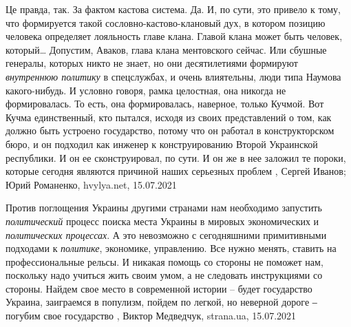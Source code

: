 Це правда, так. За фактом кастова система.
Да. И, по сути, это привело к тому, что формируется такой
сословно-кастово-клановый дух, в котором позицию человека определяет лояльность
главе клана. Главой клана может быть человек, который… Допустим, Аваков, глава
клана ментовского сейчас. Или сбушные генералы, которых никто не знает, но они
десятилетиями формируют \emph{внутреннюю политику} в спецслужбах, и очень влиятельны,
люди типа Наумова какого-нибудь. И условно говоря, рамка целостная, она никогда
не формировалась. То есть, она формировалась, наверное, только Кучмой.
Вот Кучма единственный, кто пытался, исходя из своих представлений о том, как
должно быть устроено государство, потому что он работал в конструкторском бюро,
и он подходил как инженер к конструированию Второй Украинской республики. И он
ее сконструировал, по сути. И он же в нее заложил те пороки, которые сегодня
являются причиной наших серьезных проблем
, 
Сергей Иванов; Юрий Романенко, hvylya.net, 15.07.2021

Против поглощения Украины другими странами нам необходимо запустить
\emph{политический} процесс поиска места Украины в мировых экономических и
\emph{политических процессах}. А это невозможно с сегодняшними примитивными подходами
к \emph{политике}, экономике, управлению. Все нужно менять, ставить на
профессиональные рельсы. И никакая помощь со стороны не поможет нам, поскольку
надо учиться жить своим умом, а не следовать инструкциями со стороны. Найдем
свое место в современной истории – будет государство Украина, заиграемся в
популизм, пойдем по легкой, но неверной дороге ‒ погубим свое государство
, 
Виктор Медведчук, strana.ua, 15.07.2021
